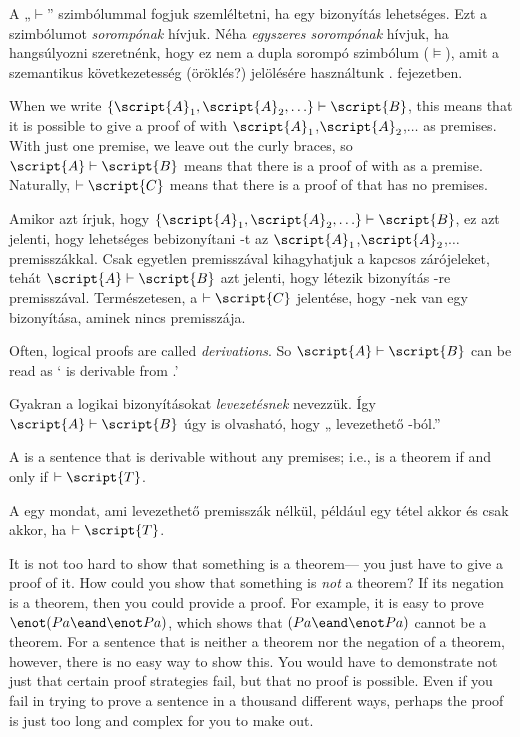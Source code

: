 A „$\vdash$” szimbólummal fogjuk szemléltetni, ha egy bizonyítás lehetséges. Ezt a szimbólumot \emph{sorompónak} hívjuk. Néha \emph{egyszeres sorompónak} hívjuk, ha hangsúlyozni szeretnénk, hogy ez nem a {dupla sorompó} szimbólum ($\models$), amit a szemantikus következetesség (öröklés?) jelölésére használtunk . fejezetben.

When we write $\{\script{A}_1,\script{A}_2,\ldots\}\vdash\script{B}$, this means that it is possible to give a proof of  with $\script{A}_1$,$\script{A}_2$,$\ldots$ as premises. With just one premise, we leave out the curly braces, so $\script{A}\vdash\script{B}$ means that there is a proof of  with  as a premise. Naturally, $\vdash\script{C}$ means that there is a proof of  that has no premises.

Amikor azt írjuk, hogy $\{\script{A}_1,\script{A}_2,\ldots\}\vdash\script{B}$, ez azt jelenti, hogy lehetséges bebizonyítani  -t az $\script{A}_1$,$\script{A}_2$,$\ldots$ premisszákkal. Csak egyetlen premisszával kihagyhatjuk a kapcsos zárójeleket, tehát $\script{A}\vdash\script{B}$ azt jelenti, hogy létezik bizonyítás -re  premisszával. Természetesen, a $\vdash\script{C}$ jelentése, hogy -nek van egy bizonyítása, aminek nincs premisszája.

Often, logical proofs are called \emph{derivations}. So $\script{A}\vdash\script{B}$ can be read as ` is derivable from .'

Gyakran a logikai bizonyításokat \emph{levezetésnek} nevezzük. Így $\script{A}\vdash\script{B}$ úgy is olvasható, hogy „ levezethető -ból.”

A  is a sentence that is derivable without any premises; i.e.,  is a theorem if and only if $\vdash\script{T}$.

A  egy mondat, ami levezethető premisszák nélkül, például  egy tétel akkor és csak akkor, ha $\vdash\script{T}$.

It is not too hard to show that something is a theorem--- you just have to give a proof of it. How could you show that something is \emph{not} a theorem? If its negation is a theorem, then you could provide a proof. For example, it is easy to prove $\enot(Pa \eand \enot Pa)$, which shows that $(Pa \eand \enot Pa)$ cannot be a theorem. For a sentence that is neither a theorem nor the negation of a theorem, however, there is no easy way to show this. You would have to demonstrate not just that certain proof strategies fail, but that no proof is possible. Even if you fail in trying to prove a sentence in a thousand different ways, perhaps the proof is just too long and complex for you to make out.

